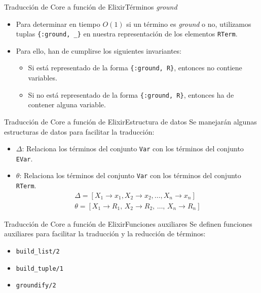 \documentclass[14pt,aspectratio=169]{beamer}
\begin{document}
\begin{frame}{Traducción de Core a función de Elixir}{Términos \textit{ground}}
  \begin{itemize}
    \item Para determinar en tiempo $O(1)$ si un término es \textit{ground} o no,
    utilizamos tuplas \texttt{\{:ground, \_\}} en nuestra representación de los
    elementos \texttt{RTerm}.
    \item Para ello, han de cumplirse los siguientes invariantes:
    \begin{itemize}
      \item Si está representado de la forma \texttt{\{:ground, R\}}, entonces
      no contiene variables.
      \item Si no está representado de la forma \texttt{\{:ground, R\}}, entonces
      ha de contener alguna variable.
    \end{itemize}
  \end{itemize}
\end{frame}

\begin{frame}{Traducción de Core a función de Elixir}{Estructura de datos}
  Se manejarán algunas estructuras de datos para facilitar la traducción:
  \begin{itemize}
    \item $\Delta$: Relaciona los términos del conjunto \texttt{Var} con los
    términos del conjunto \texttt{EVar}.
    \item $\theta$: Relaciona los términos del conjunto \texttt{Var} con los
    términos del conjunto \texttt{RTerm}.
    \begin{align*}
      \Delta = [X_1 \rightarrow x_1, X_2 \rightarrow x_2, \ldots, X_n \rightarrow x_n]\\
      \theta = [X_1 \rightarrow R_1,\, X_2 \rightarrow R_2,\, \ldots,\, X_n \rightarrow R_n]
    \end{align*}
  \end{itemize}
\end{frame}

\begin{frame}{Traducción de Core a función de Elixir}{Funciones auxiliares}
  Se definen funciones auxiliares para facilitar la traducción y la reducción
  de términos:

  \begin{itemize}
    \item \texttt{build\_list/2}
    \item \texttt{build\_tuple/1}
    \item \texttt{groundify/2}
  \end{itemize}
\end{frame}
\end{document}
